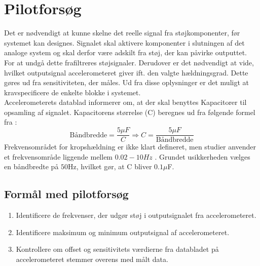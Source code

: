 \chapter{Pilotforsøg}\label{Bilag:Pilotforsoeg}
Det er nødvendigt at kunne skelne det reelle signal fra støjkomponenter, før systemet kan designes. Signalet skal aktivere komponenter i slutningen af det analoge system og skal derfor være adskilt fra støj, der kan påvirke outputtet. For at undgå dette frafiltreres støjsignaler. Derudover er det nødvendigt at vide, hvilket outputsignal accelerometeret giver ift. den valgte hældningsgrad. Dette gøres ud fra sensitiviteten, der måles. Ud fra disse oplysninger er det muligt at kravspecificere de enkelte blokke i systemet. \\ %
Accelerometerets datablad informerer om, at der skal benyttes Kapacitorer til opsamling af signalet. Kapacitorens størrelse (C) beregnes ud fra følgende formel fra \cite{Devices2009}:
\begin{equation}
\text{Båndbredde} = \dfrac{5\mu F}{C} \Rightarrow  C = \dfrac{5\mu F}{\text{Båndbredde}}
\end{equation}
Frekvensområdet for kropshældning er ikke klart defineret, men studier anvender et frekvensområde liggende mellem $0.02-10Hz$ \cite{Martinez-Mendez2011}. Grundet usikkerheden vælges en båndbredte på $50$Hz, hvilket gør, at C bliver $0.1\mu$F.

\section{Formål med pilotforsøg}
\begin{enumerate}
\item Identificere de frekvenser, der udgør støj i outputsignalet fra accelerometeret.
\item Identificere maksimum og minimum outputsignal af accelerometeret.
\item Kontrollere om offset og sensitivitets værdierne fra databladet på accelerometeret stemmer overens med målt data.
\end{enumerate}


